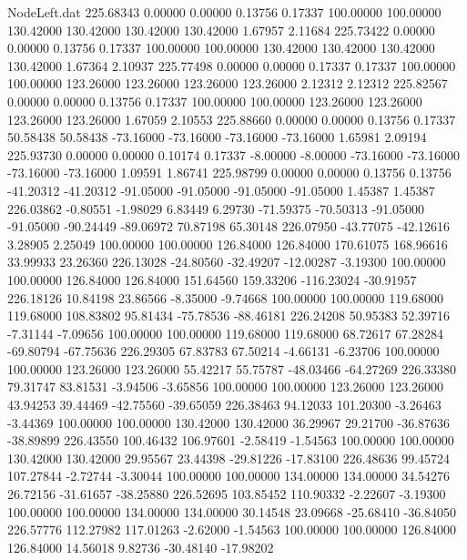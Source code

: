 \begin{filecontents}{NodeLeft.dat}
 225.68343    0.00000    0.00000     0.13756    0.17337  100.00000  100.00000  130.42000  130.42000  130.42000  130.42000    1.67957    2.11684
 225.73422    0.00000    0.00000     0.13756    0.17337  100.00000  100.00000  130.42000  130.42000  130.42000  130.42000    1.67364    2.10937
 225.77498    0.00000    0.00000     0.17337    0.17337  100.00000  100.00000  123.26000  123.26000  123.26000  123.26000    2.12312    2.12312
 225.82567    0.00000    0.00000     0.13756    0.17337  100.00000  100.00000  123.26000  123.26000  123.26000  123.26000    1.67059    2.10553
 225.88660    0.00000    0.00000     0.13756    0.17337   50.58438   50.58438  -73.16000  -73.16000  -73.16000  -73.16000    1.65981    2.09194
 225.93730    0.00000    0.00000     0.10174    0.17337   -8.00000   -8.00000  -73.16000  -73.16000  -73.16000  -73.16000    1.09591    1.86741
 225.98799    0.00000    0.00000     0.13756    0.13756  -41.20312  -41.20312  -91.05000  -91.05000  -91.05000  -91.05000    1.45387    1.45387
 226.03862   -0.80551   -1.98029     6.83449    6.29730  -71.59375  -70.50313  -91.05000  -91.05000  -90.24449  -89.06972   70.87198   65.30148
 226.07950  -43.77075  -42.12616     3.28905    2.25049  100.00000  100.00000  126.84000  126.84000  170.61075  168.96616   33.99933   23.26360
 226.13028  -24.80560  -32.49207   -12.00287   -3.19300  100.00000  100.00000  126.84000  126.84000  151.64560  159.33206 -116.23024  -30.91957
 226.18126   10.84198   23.86566    -8.35000   -9.74668  100.00000  100.00000  119.68000  119.68000  108.83802   95.81434  -75.78536  -88.46181
 226.24208   50.95383   52.39716    -7.31144   -7.09656  100.00000  100.00000  119.68000  119.68000   68.72617   67.28284  -69.80794  -67.75636
 226.29305   67.83783   67.50214    -4.66131   -6.23706  100.00000  100.00000  123.26000  123.26000   55.42217   55.75787  -48.03466  -64.27269
 226.33380   79.31747   83.81531    -3.94506   -3.65856  100.00000  100.00000  123.26000  123.26000   43.94253   39.44469  -42.75560  -39.65059
 226.38463   94.12033  101.20300    -3.26463   -3.44369  100.00000  100.00000  130.42000  130.42000   36.29967   29.21700  -36.87636  -38.89899
 226.43550  100.46432  106.97601    -2.58419   -1.54563  100.00000  100.00000  130.42000  130.42000   29.95567   23.44398  -29.81226  -17.83100
 226.48636   99.45724  107.27844    -2.72744   -3.30044  100.00000  100.00000  134.00000  134.00000   34.54276   26.72156  -31.61657  -38.25880
 226.52695  103.85452  110.90332    -2.22607   -3.19300  100.00000  100.00000  134.00000  134.00000   30.14548   23.09668  -25.68410  -36.84050
 226.57776  112.27982  117.01263    -2.62000   -1.54563  100.00000  100.00000  126.84000  126.84000   14.56018    9.82736  -30.48140  -17.98202

\end{filecontents}
